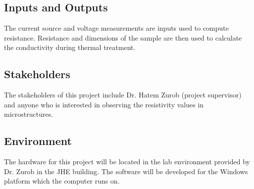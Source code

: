 \documentclass[12pt, titlepage]{article}
\begin{document}
\subsection{Inputs and Outputs}
The current source and voltage measurements are inputs used to compute resistance.
Resistance and dimensions of the sample are then used to calculate the conductivity 
during thermal treatment.

\subsection{Stakeholders}
The stakeholders of this project include Dr. Hatem Zurob (project supervisor) and 
anyone who is interested in observing the resistivity values in microstructures.

\subsection{Environment}
The hardware for this project will be located in the lab environment provided by Dr. Zurob in the JHE building. 
The software will be developed for the Windows platform which the computer runs on.

\end{document}
